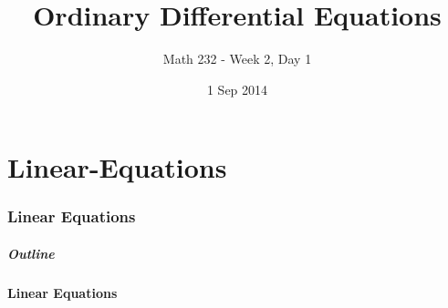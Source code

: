 \part{Linear-Equations}
\section{Linear Equations}


\title{Ordinary Differential Equations}
\subtitle{Math 232 - Week 2, Day 1}
\date{1 Sep 2014}

\begin{frame}
  \titlepage
\end{frame}

\begin{frame}
  \frametitle{Outline}
  \tableofcontents[ currentsection ]
\end{frame}


\subsection{Linear Equations}


